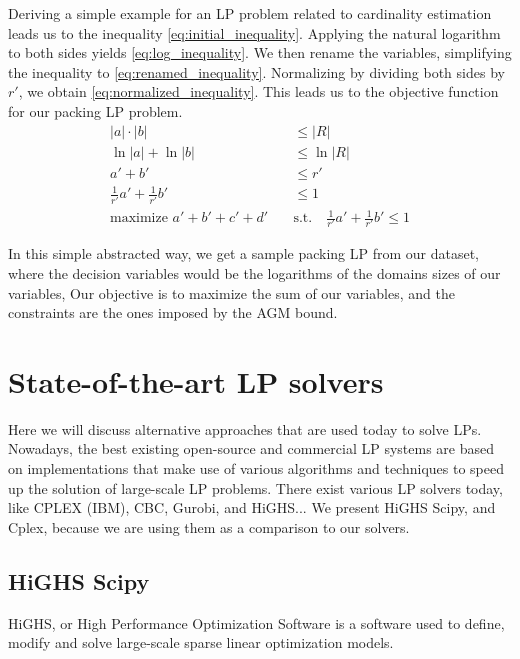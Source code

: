 Deriving a simple example for an LP problem related to cardinality estimation leads us to the inequality \ref{eq:initial_inequality}. Applying the natural logarithm to both sides yields \ref{eq:log_inequality}. We then rename the variables, simplifying the inequality to \ref{eq:renamed_inequality}.
Normalizing by dividing both sides by \(r'\), we obtain \ref{eq:normalized_inequality}. This leads us to the objective function for our packing LP problem.
\begin{align}
    |a| \cdot |b|                            & \leq |R| \label{eq:initial_inequality}                                                   \\
    \ln|a| + \ln|b|                          & \leq \ln|R| \label{eq:log_inequality}                                                    \\
    a' + b'                                  & \leq r' \label{eq:renamed_inequality}                                                    \\
    \frac{1}{r'} a' + \frac{1}{r'} b'        & \leq 1 \label{eq:normalized_inequality}                                                  \\
    \text{maximize } a' + b' + c' + d' \quad & \text{s.t.} \quad \frac{1}{r'} a' + \frac{1}{r'} b' \leq 1 \label{eq:objective_function}
\end{align}

In this simple abstracted way, we get a sample packing LP from our dataset, where the decision variables would be the logarithms of the domains sizes of our variables, Our objective is to maximize the sum of our variables, and the constraints are the ones imposed by the AGM bound.

\section{State-of-the-art LP solvers}
Here we will discuss alternative approaches that are used today to solve LPs. Nowadays, the best
existing open-source and commercial LP systems are based on implementations that make use
of various algorithms and techniques to speed up the solution of large-scale LP problems.
There exist various LP solvers today, like CPLEX (IBM), CBC, Gurobi, and HiGHS... We present HiGHS Scipy, and
Cplex, because we are using them as a comparison to our solvers.
\subsection{HiGHS Scipy}
HiGHS, or High Performance Optimization Software is a software used to define,
modify and solve large-scale sparse linear optimization models.


